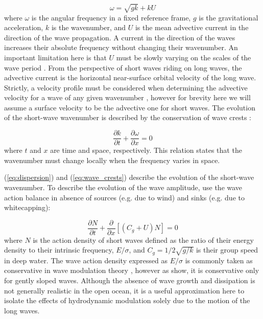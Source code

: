 \documentclass[lineno]{jfm}
\begin{document}
\begin{equation}
\label{eq:dispersion}
\omega = \sqrt{gk} + k U
\end{equation}
where $\omega$ is the angular frequency in a fixed reference frame, $g$ is the
gravitational acceleration, $k$ is the wavenumber, and $U$ is the mean advective
current in the direction of the wave propagation.
A current in the direction of the waves increases their absolute frequency
without changing their wavenumber.
An important limitation here is that $U$ must be slowly varying on the scales of
the wave period \citep{bretherton1968wavetrains}.
From the perspective of short waves riding on long waves, the advective current
is the horizontal near-surface orbital velocity of the long wave.
Strictly, a velocity profile must be considered when determining the
advective velocity for a wave of any given wavenumber \citep{stewart1974hf},
however for brevity here we will assume a surface velocity to be the advective
one for short waves.
The evolution of the short-wave wavenumber is described by the conservation of
wave crests \citep{phillips1981dispersion}:

\begin{equation}
\label{eq:wave_crests}
\dfrac{\partial k}{\partial t}
+ \dfrac{\partial \omega}{\partial x}
= 0
\end{equation}
where $t$ and $x$ are time and space, respectively.
This relation states that the wavenumber must change locally when the frequency
varies in space.

(\ref{eq:dispersion}) and (\ref{eq:wave_crests}) describe the evolution of
the short-wave wavenumber.
To describe the evolution of the wave amplitude, use the wave action balance
\citep{bretherton1968wavetrains} in absence of sources (e.g. due to wind) and
sinks (e.g. due to whitecapping):

\begin{equation}
\label{eq:wave_action}
\dfrac{\partial N}{\partial t}
+ \dfrac{\partial}{\partial x} \left[\left(C_g + U\right)N\right]
= 0
\end{equation}
where $N$ is the action density of short waves defined as the ratio of their
energy density to their intrinsic frequency, $E/\sigma$,
and $C_g = 1/2\sqrt{g/k}$ is their group speed in deep water.
The wave action density expressed as $E/\sigma$ is commonly taken as
conservative in wave modulation theory
\citep{phillips1981dispersion,longuet1987propagation}, however as
\citet{dysthe1988orbiting} show, it is conservative only for gently sloped waves.
Although the absence of wave growth and dissipation is not generally realistic in
the open ocean, it is a useful approximation here to isolate the effects
of hydrodynamic modulation solely due to the motion of the long waves.
\end{document}
